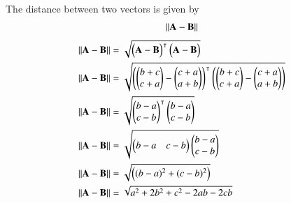 The distance between two vectors is given by 
\begin{align}
\norm{\vec{A}-\vec{B}}
\label{eq5}
\end{align}
\begin{align}
\norm{\vec{A}-\vec{B}}&= \sqrt{\myvec{\vec{A}-\vec{B}}^\intercal\myvec{\vec{A}-\vec{B}}}\\
\norm{\vec{A}-\vec{B}}&=\sqrt{\myvec{{\myvec{b+c\\c+a} -\myvec{c+a\\a+b}}}^\intercal \myvec{{\myvec{b+c\\c+a} -\myvec{c+a\\a+b}}}}\\
\norm{\vec{A}-\vec{B}}&=\sqrt{\myvec{b-a\\c-b}^\intercal \myvec{b-a\\c-b}}\\
\norm{\vec{A}-\vec{B}}&=\sqrt{\myvec{b-a & c-b}\myvec{b-a\\c-b}} \\
\norm{\vec{A}-\vec{B}}&=\sqrt{\myvec{(b-a)^2+(c-b)^2}} \\
\norm{\vec{A}-\vec{B}}&=\sqrt{a^2+2b^2+c^2-2ab-2cb}
\end{align}
